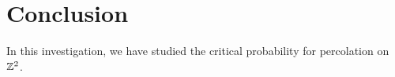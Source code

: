 \documentclass[a4paper, 12pt]{article}
\begin{document}
%
%
%
%
%
%
%

\section{Conclusion}
In this investigation, we have studied the critical probability for percolation on $\mathbb{Z}^2$.
\end{document}
